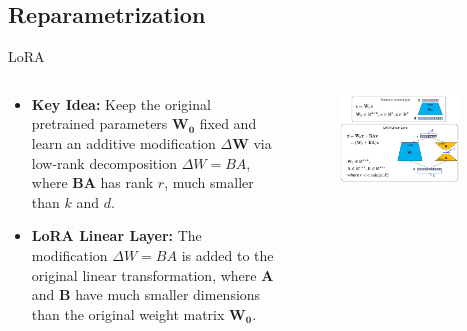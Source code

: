 \documentclass[serif, aspectratio=169]{beamer}
\begin{document}
\subsection{Reparametrization}
\begin{frame}{LoRA}
    \begin{columns}

        \begin{column}{0.5\textwidth}
            \begin{itemize}
                \item  
                    \textbf{Key Idea:} Keep the original pretrained parameters \( \boldsymbol{W_0} \) fixed and learn an additive modification \( \Delta \boldsymbol{W} \) via low-rank decomposition \( \Delta W = BA \), where \( \boldsymbol{BA} \) has rank \( r \), much smaller than \( k \) and \( d \).

                \item  
                    \textbf{LoRA Linear Layer:} The modification \( \Delta W = BA \) is added to the original linear transformation, where \( \boldsymbol{A} \) and \( \boldsymbol{B} \) have much smaller dimensions than the original weight matrix \( \boldsymbol{W_0} \).
            \end{itemize}
        \end{column}

        \begin{column}{0.5\textwidth}
            \begin{figure}
            \centering
            \includegraphics[width=0.9\textwidth, height=0.8\textheight]{pic/LoRA.jpg}
            \end{figure}
        \end{column}

    \end{columns}
\end{frame}
\end{document}
